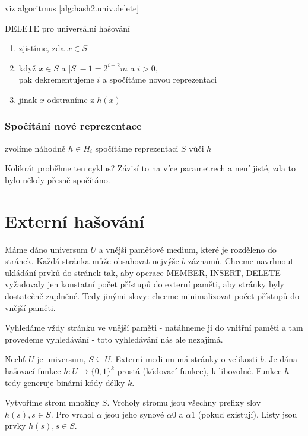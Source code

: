 viz algoritmus \ref{alg:hash2.univ.delete}

\begin{algorithm}[!htb]
\caption{DELETE pro universální hašování}
\label{alg:hash2.univ.delete}
\begin{enumerate}
\item zjistíme, zda $x \in S$ 
\item když $x \in S$ a $|S|-1 = 2^{i-2} m$ a $i>0$,\\
 pak dekrementujeme $i$ a spočítáme novou reprezentaci
\item jinak $x$ odstraníme z $h(x)$ 
\end{enumerate}
\end{algorithm}


\subsubsection{Spočítání nové reprezentace}

\begin{algorithmic}
\REPEAT
  \STATE zvolíme náhodně $h \in H_i$ 
  \STATE spočítáme reprezentaci $S$ vůči $h$ 
\end{algorithmic}

\noindent
Kolikrát proběhne ten cyklus? Závisí to na více parametrech 
a není jisté, zda to bylo někdy přesně spočítáno.


\section{Externí hašování}

Máme dáno universum $U$ a vnější paměťové medium, které je rozděleno do
stránek. Každá stránka může obsahovat nejvýše $b$ záznamů. Chceme navrhnout
ukládání prvků do stránek tak, aby operace MEMBER, INSERT, DELETE
vyžadovaly jen konstatní počet přístupů do externí paměti, aby stránky
byly dostatečně zaplněné. Tedy jinými slovy: chceme minimalizovat počet
přístupů do vnější paměti.
\par
Vyhledáme vždy stránku ve vnější paměti - natáhneme ji do vnitřní paměti a
tam provedeme vyhledávání - toto vyhledávání nás ale nezajímá.
\par
Nechť $U$ je universum, $S \subseteq U$. Externí medium má stránky o
velikosti $b$. Je dána hašovací funkce $h:U \rightarrow \{0,1\}^k$ prostá
(kódovací funkce), k libovolné. Funkce $h$ tedy generuje binární kódy délky
$k$.
\par
Vytvoříme strom množiny $S$. Vrcholy stromu jsou všechny prefixy slov $h(s),
s \in S$. Pro vrchol $\alpha$ jsou jeho synové $\alpha 0$ a $\alpha 1$
(pokud existují). Listy jsou prvky $h(s), s \in S$.

